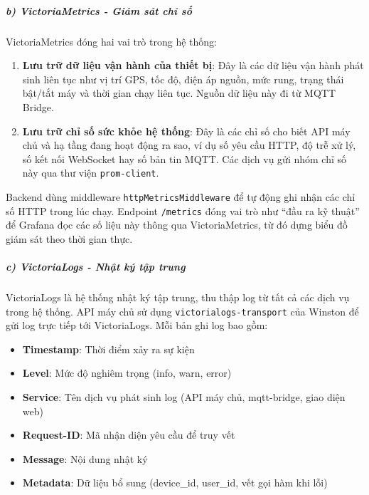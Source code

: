 \documentclass[a4paper]{extarticle}
\providecommand{\tightlist}{%
  \setlength{\itemsep}{0pt}\setlength{\parskip}{0pt}}
\begin{document}
\subparagraph{b) VictoriaMetrics - Giám sát chỉ số}\label{b-victoriametrics---giuxe1m-suxe1t-chux1ec9-sux1ed1-metrics}

VictoriaMetrics đóng hai vai trò trong hệ thống:

\begin{enumerate}
\def\labelenumi{\arabic{enumi}.}
\tightlist
\item
  \textbf{Lưu trữ dữ liệu vận hành của thiết bị}: Đây là các dữ liệu vận hành
  phát sinh liên tục như vị trí GPS, tốc độ, điện áp nguồn, mức rung,
  trạng thái bật/tắt máy và thời gian chạy liên tục. Nguồn dữ liệu này đi từ MQTT Bridge.
\item
  \textbf{Lưu trữ chỉ số sức khỏe hệ thống}: Đây là các chỉ số cho biết
  API máy chủ và hạ tầng đang hoạt động ra sao, ví dụ số yêu cầu HTTP, độ
  trễ xử lý, số kết nối WebSocket hay số bản tin MQTT. Các dịch vụ gửi
  nhóm chỉ số này qua thư viện \texttt{prom-client}.
\end{enumerate}

Backend dùng middleware \texttt{httpMetricsMiddleware} để tự động ghi
nhận các chỉ số HTTP trong lúc chạy. Endpoint \texttt{/metrics} đóng vai
trò như ``đầu ra kỹ thuật'' để Grafana đọc các số liệu này thông qua
VictoriaMetrics, từ đó dựng biểu đồ giám sát theo thời gian thực.

\subparagraph{c) VictoriaLogs - Nhật ký tập trung}\label{c-victorialogs---nhux1eadt-kuxfd-tux1eadp-trung-centralized-logging}

VictoriaLogs là hệ thống nhật ký tập trung, thu thập log từ tất cả các
dịch vụ trong hệ thống. API máy chủ sử dụng \texttt{victorialogs-transport}
của Winston để gửi log trực tiếp tới VictoriaLogs. Mỗi bản ghi log bao
gồm:

\begin{itemize}
\tightlist
\item
  \textbf{Timestamp}: Thời điểm xảy ra sự kiện
\item
  \textbf{Level}: Mức độ nghiêm trọng (info, warn, error)
\item
  \textbf{Service}: Tên dịch vụ phát sinh log (API máy chủ, mqtt-bridge,
  giao diện web)
\item
  \textbf{Request-ID}: Mã nhận diện yêu cầu để truy vết
\item
  \textbf{Message}: Nội dung nhật ký
\item
  \textbf{Metadata}: Dữ liệu bổ sung (device\_id, user\_id, vết gọi hàm khi lỗi)
\end{itemize}
\end{document}
